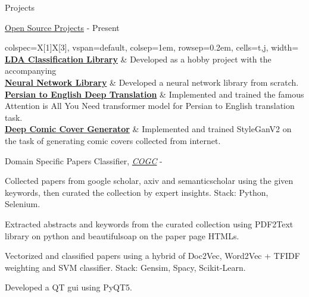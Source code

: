 \documentclass[../professional-cv.tex]{subfiles}
\begin{document}
	\begin{rSection}{Projects}
		
		\begin{rSubsection}
			{\href{https://github.com/FeryET}{Open Source Projects}}
			{  - Present }
			{}{}
			\begin{tblr}{colspec={X[1]X[3]}, vspan=default, colsep=1em, rowsep=0.2em, cells={t,j}, width=\linewidth}
				\href{https://github.com/FeryET/lda_classification}{\textbf{LDA Classification Library}} & {Developed as a hobby project with the accompanying } \\
				\href{https://github.com/FeryET/scratch_nn_lib}{\textbf{Neural Network Library}} & {Developed a neural network library from scratch.} \\
				\href{https://github.com/FeryET/persian-to-english-transformer}{\textbf{Persian to English Deep Translation}} & {Implemented and trained the famous Attention is All You Need transformer model for Persian to English translation task}.\\
				\href{https://github.com/FeryET/comic-cover-generator}{\textbf{Deep Comic Cover Generator}} & {Implemented and trained StyleGanV2 on the task of generating comic covers collected from internet}.\\
			\end{tblr}
			
			
		\end{rSubsection}
		
		\begin{rSubsection}
			{Domain Specific Papers Classifier, \em{\href{https://cogc.ir/}{COGC}}}
			{  - \fmtdate{10}{2018} }
			{}{}
			
			\item Collected papers from google scholar, axiv and semanticscholar using the given keywords, then curated the collection by expert insights. Stack: Python, Selenium.
			\item Extracted abstracts and keywords from the curated collection using PDF2Text library on python and beautifulsoap on the paper page HTMLs.
			\item Vectorized and classified papers using a hybrid of Doc2Vec, Word2Vec + TFIDF weighting and SVM classifier. Stack: Gensim, Spacy, Scikit-Learn.
			\item Developed a QT gui using PyQT5.
			
		\end{rSubsection}
		
		
	\end{rSection}
\end{document}
